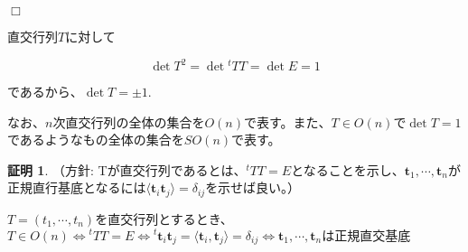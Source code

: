 \documentclass[dvipdfmx,autodetect-engine]{jsarticle}
\theoremstyle{definition}
\newtheorem*{Proof*}{証明}
\newcommand{\transposeMat}[1]{{}^t\!{#1}}
\begin{document}
$\Box$

直交行列$T$に対して

$$
\det T^2 = \det \transposeMat{T}T = \det E = 1
$$

であるから、$\det T = \pm1$.

なお、$n$次直交行列の全体の集合を$O(n)$で表す。また、$T \in O(n)$で$\det T = 1$であるようなもの全体の集合を$SO(n)$で表す。


\begin{Proof*}
（方針: Tが直交行列であるとは、$\transposeMat{T}T = E$となることを示し、$\bm{t}_1, \cdots, \bm{t}_n$が正規直行基底となるには$\langle \bm{t}_i\bm{t}_j \rangle = \delta_{ij}$を示せば良い。）

$T = (t_1, \cdots, t_n)$を直交行列とするとき、$T \in O(n) \Longleftrightarrow \transposeMat{T}T = E \Longleftrightarrow \transposeMat{\bm{t}_i}\bm{t}_j = \langle \bm{t}_i, \bm{t}_j \rangle =  \delta_{ij} \Longleftrightarrow \bm{t}_1, \cdots, \bm{t}_nは正規直交基底$
\end{Proof*}
\end{document}
